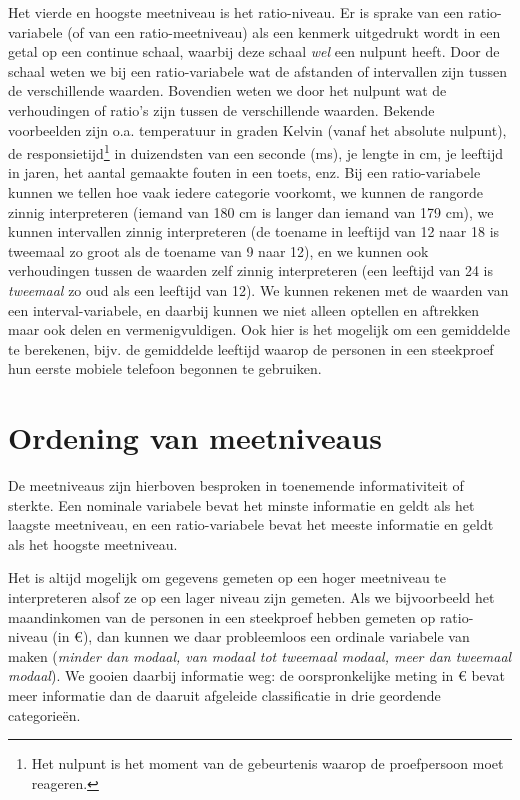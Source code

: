\documentclass[
]{book}
\begin{document}
Het vierde en hoogste meetniveau is het ratio-niveau. Er is sprake van
een ratio-variabele (of van een ratio-meetniveau) als een kenmerk
uitgedrukt wordt in een getal op een continue schaal, waarbij deze
schaal \emph{wel} een nulpunt heeft. Door de schaal weten we bij een
ratio-variabele wat de afstanden of intervallen zijn tussen de
verschillende waarden. Bovendien weten we door het nulpunt wat de
verhoudingen of ratio's zijn tussen de verschillende waarden. Bekende
voorbeelden zijn o.a. temperatuur in graden Kelvin (vanaf het absolute
nulpunt), de responsietijd\footnote{Het nulpunt is het moment van de gebeurtenis waarop de proefpersoon moet reageren.} in duizendsten van een seconde (ms), je
lengte in cm, je leeftijd in jaren, het aantal gemaakte fouten in een
toets, enz. Bij een ratio-variabele kunnen we tellen hoe vaak iedere
categorie voorkomt, we kunnen de rangorde zinnig interpreteren (iemand
van 180 cm is langer dan iemand van 179 cm), we kunnen intervallen
zinnig interpreteren (de toename in leeftijd van 12 naar 18 is tweemaal
zo groot als de toename van 9 naar 12), en we kunnen ook verhoudingen
tussen de waarden zelf zinnig interpreteren (een leeftijd van 24 is
\emph{tweemaal} zo oud als een leeftijd van 12). We kunnen rekenen met de
waarden van een interval-variabele, en daarbij kunnen we niet alleen
optellen en aftrekken maar ook delen en vermenigvuldigen. Ook hier is
het mogelijk om een gemiddelde te berekenen, bijv. de gemiddelde leeftijd
waarop de personen in een steekproef hun eerste mobiele telefoon begonnen te gebruiken.

\section{Ordening van meetniveaus}\label{sec:ordeningvanmeetniveaus}

De meetniveaus zijn hierboven besproken in toenemende informativiteit of
sterkte. Een nominale variabele bevat het minste informatie en geldt als
het laagste meetniveau, en een ratio-variabele bevat het meeste
informatie en geldt als het hoogste meetniveau.

Het is altijd mogelijk om gegevens gemeten op een hoger meetniveau te
interpreteren alsof ze op een lager niveau zijn gemeten. Als we
bijvoorbeeld het maandinkomen van de personen in een steekproef hebben
gemeten op ratio-niveau (in €), dan kunnen we daar probleemloos een
ordinale variabele van maken (\emph{minder dan modaal, van modaal tot
tweemaal modaal, meer dan tweemaal modaal}). We gooien daarbij
informatie weg: de oorspronkelijke meting in € bevat meer informatie dan
de daaruit afgeleide classificatie in drie geordende categorieën.
\end{document}
